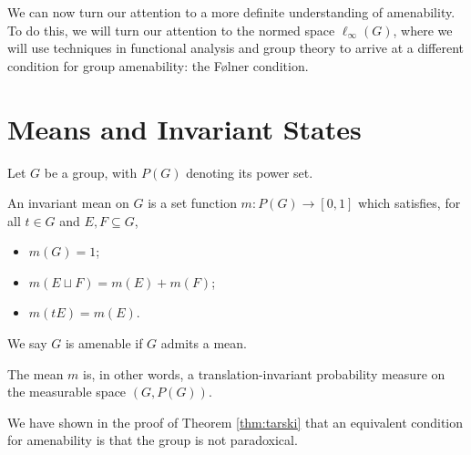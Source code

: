 We can now turn our attention to a more definite understanding of amenability. To do this, we will turn our attention to the normed space $\ell_{\infty}\left(G\right)$, where we will use techniques in functional analysis and group theory to arrive at a different condition for group amenability: the Følner condition.
\section{Means and Invariant States}%
\begin{definition}
  Let $G$ be a group, with $P(G)$ denoting its power set.\newline

  An invariant {mean} on $G$ is a set function $m\colon P(G)\rightarrow [0,1]$ which satisfies, for all $t\in G$ and $E,F\subseteq G$,
  \begin{itemize}
    \item $m(G) = 1$;
    \item $m\left(E\sqcup F\right) = m(E) + m(F)$;
    \item $m\left(tE\right) = m\left(E\right)$.
  \end{itemize}
  We say $G$ is amenable if $G$ admits a mean.\newline

  The mean $m$ is, in other words, a translation-invariant probability measure on the measurable space $\left(G,P(G)\right)$.
\end{definition}
We have shown in the proof of Theorem \ref{thm:tarski} that an equivalent condition for amenability is that the group is not paradoxical.\newline

